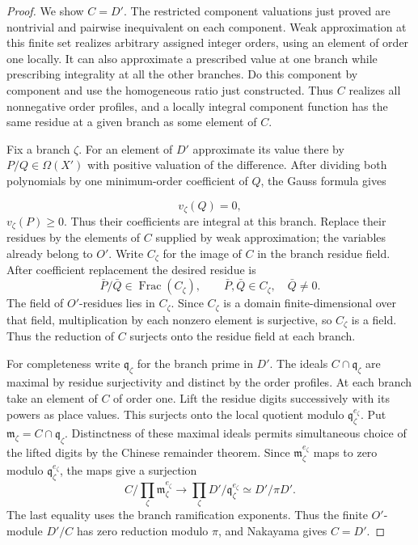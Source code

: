 \begin{proof}
We show \(C=D'\). The restricted component valuations just
proved are nontrivial and pairwise inequivalent on each
component. Weak approximation at this finite set realizes
arbitrary assigned integer orders, using an element of order
one locally. It can also approximate a prescribed value
at one branch while prescribing integrality at all the other
branches. Do this component by component and use the homogeneous
ratio just constructed. Thus \(C\) realizes all nonnegative
order profiles, and a locally integral component function has
the same residue at a given branch as some element of \(C\).
\cite{weak-approximation}

Fix a branch \(\zeta\). For an element of \(D'\) approximate
its value there by \(P/Q\in\Omega(X')\) with positive valuation
of the difference. After dividing both polynomials by one
minimum-order coefficient of \(Q\), the Gauss formula gives

\[
  v_\zeta(Q)=0,
\]
 \(v_\zeta(P)\ge0\). Thus their coefficients
are integral at this branch. Replace their residues by the
elements of \(C\) supplied by weak approximation; the variables
already belong to \(O'\). Write \(C_\zeta\) for the image of \(C\) in the branch residue
field. After coefficient replacement the desired residue is
\[
            \bar P/\bar Q\in\operatorname{Frac}(C_\zeta),
                      \qquad \bar P,\bar Q\in C_\zeta,\quad \bar Q\ne0 .
\]
The field of \(O'\)-residues lies in \(C_\zeta\). Since \(C_\zeta\)
is a domain finite-dimensional over that field, multiplication by
each nonzero element is surjective, so \(C_\zeta\) is a field.
Thus the reduction of \(C\) surjects onto the residue field at
each branch.

For completeness write \(\mathfrak q_\zeta\) for the branch
prime in \(D'\). The ideals \(C\cap\mathfrak q_\zeta\) are
maximal by residue surjectivity and distinct by the order
profiles. At each branch take an element of \(C\) of order
one. Lift the residue digits successively with its powers
as place values. This surjects onto the local quotient modulo
\(\mathfrak q_\zeta^{e_\zeta}\). Put \(\mathfrak m_\zeta=C\cap\mathfrak q_\zeta\).
Distinctness of these maximal ideals permits simultaneous
choice of the lifted digits by the Chinese remainder theorem.
Since \(\mathfrak m_\zeta^{e_\zeta}\) maps to zero modulo
\(\mathfrak q_\zeta^{e_\zeta}\), the maps give a surjection
\[
 C/\!\prod_\zeta\mathfrak m_\zeta^{e_\zeta}
   \longrightarrow
    \prod_\zeta D'/\mathfrak q_\zeta^{e_\zeta}
       \simeq D'/\pi D'.
\]
The last equality uses the branch ramification exponents.
Thus the finite \(O'\)-module \(D'/C\) has zero reduction
modulo \(\pi\), and Nakayama gives \(C=D'\).


\end{proof}

